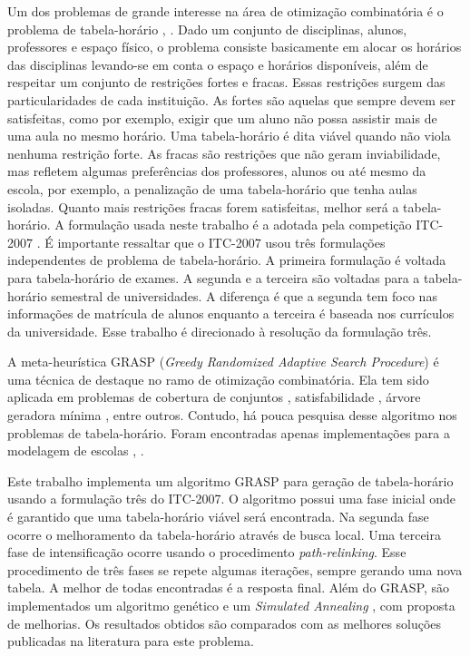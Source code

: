 \documentclass[11pt]{article}
\begin{document}
Um dos problemas de grande interesse na área de otimização combinatória é o problema de tabela-horário \cite{Schaerf95asurvey}, \cite{Lewis2007:survey}. Dado um conjunto de disciplinas, alunos, professores e espaço físico, o problema consiste basicamente em alocar os horários das disciplinas levando-se em conta o espaço e horários disponíveis, além de respeitar um conjunto de restrições fortes e fracas. Essas restrições surgem das particularidades de cada instituição. As fortes são aquelas que sempre devem ser satisfeitas, como por exemplo, exigir que um aluno não possa assistir mais de uma aula no mesmo horário. Uma tabela-horário é dita viável quando não viola nenhuma restrição forte. As fracas são restrições que não geram inviabilidade, mas refletem algumas preferências dos professores, alunos ou até mesmo da escola, por exemplo, a penalização de uma tabela-horário que tenha aulas isoladas. Quanto mais restrições fracas forem satisfeitas, melhor será a tabela-horário. A formulação usada neste trabalho é a adotada pela competição ITC-2007 \cite{itc2007}. É importante ressaltar que o ITC-2007 usou três formulações independentes de problema de tabela-horário. A primeira formulação é voltada para tabela-horário de exames. A segunda e a terceira são voltadas para a tabela-horário semestral de universidades. A diferença é que a segunda tem foco nas informações de matrícula de alunos enquanto a terceira é baseada nos currículos da universidade. Esse trabalho é direcionado à resolução da formulação três.

A meta-heurística GRASP (\textit{Greedy Randomized Adaptive Search Procedure}) \cite{grasp_resende_ribeiro} é uma técnica de destaque no ramo de otimização combinatória. Ela tem sido aplicada em problemas de cobertura de conjuntos \cite{Res98}, satisfabilidade \cite{FesParPitRes06a}, árvore geradora mínima \cite{Souza02agrasp}, entre outros. Contudo, há pouca pesquisa desse algoritmo nos problemas de tabela-horário. Foram encontradas apenas implementações para a modelagem de escolas \cite{Souza:2004}, \cite{Vieira_agrasp}.

Este trabalho implementa um algoritmo GRASP para geração de tabela-horário usando a formulação três do ITC-2007. O algoritmo possui uma fase inicial onde é garantido que uma tabela-horário viável será encontrada. Na segunda fase ocorre o melhoramento da tabela-horário através de busca local. Uma terceira fase de intensificação ocorre usando o procedimento \textit{path-relinking}. Esse procedimento de três fases se repete algumas iterações, sempre gerando uma nova tabela. A melhor de todas encontradas é a resposta final. Além do GRASP, são implementados um algoritmo genético \cite{Goldberg:1989} e um \textit{Simulated Annealing} \cite{Kirkpatrick13051983}, com proposta de melhorias. Os resultados obtidos são comparados com as melhores soluções publicadas na literatura para este problema.
\end{document}
